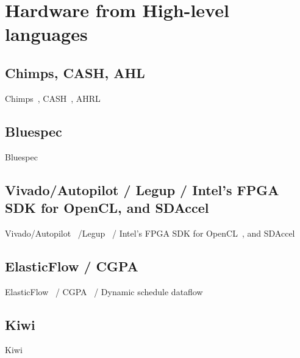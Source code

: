 

\section{Hardware from High-level languages}

\subsection{Chimps, CASH, AHL}

Chimps~\cite{chimps}, CASH~\cite{budiu_pegasus_2002,budiu_cash_2002}, AHRL~\cite{ahrl}
%

\subsection{Bluespec}
Bluespec~\cite{bluespec}
%

\subsection{Vivado/Autopilot / Legup / Intel's FPGA SDK for OpenCL, and SDAccel}

Vivado/Autopilot~\cite{vivado,vivadohls,autopilot} /Legup~\cite{canis_2011_legup} / Intel's FPGA SDK for OpenCL~\cite{opencl_sdk}, and SDAccel~\cite{sdaccel}
%

\subsection{ElasticFlow / CGPA}

ElasticFlow~\cite{elasticFlow} / CGPA~\cite{cgpa} / Dynamic schedule dataflow~\cite{josipovic_fpga_2018_dynamically}
%

\subsection{Kiwi}

Kiwi~\cite{kiwi}

